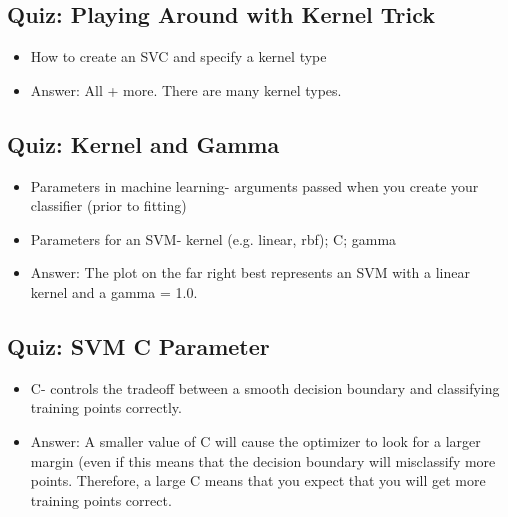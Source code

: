 \documentclass[12pt]{report}
\begin{document}
\subsection{Quiz: Playing Around with Kernel Trick}

\begin{itemize}

\item How to create an SVC and specify a kernel type

\item Answer: All + more. There are many kernel types. 

\end{itemize}


\subsection{Quiz: Kernel and Gamma}

\begin{itemize}

\item Parameters in machine learning- arguments passed when you create your classifier (prior to fitting)

\item Parameters for an SVM- kernel (e.g. linear, rbf); C; gamma

\item Answer: The plot on the far right best represents an SVM with a linear kernel and a gamma = 1.0. 

\end{itemize}

\subsection{Quiz: SVM C Parameter}

\begin{itemize} 

\item C- controls the tradeoff between a smooth decision boundary and classifying training points correctly. 

\item Answer: A smaller value of C will cause the optimizer to look for a larger margin (even if this means that the decision boundary will misclassify more points. Therefore, a large C means that you expect that you will get more training points correct. 

\end{itemize}
\end{document}
